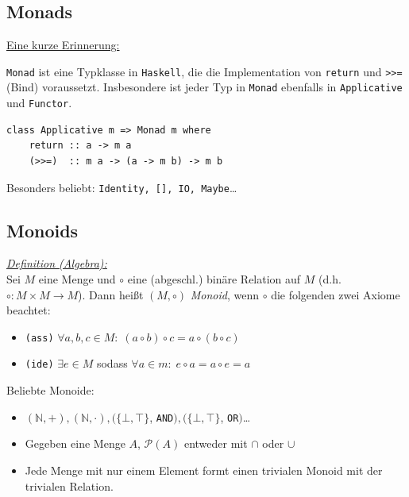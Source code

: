 \documentclass{beamer}
\begin{document}
\subsection*{Monads}

\begin{frame}[fragile]

\underline{Eine kurze Erinnerung:}\bigskip

\texttt{Monad} ist eine Typklasse in \texttt{Haskell}, die die Implementation von \texttt{return} und \texttt{>>=} (Bind) voraussetzt. Insbesondere ist jeder Typ in \texttt{Monad} ebenfalls in \texttt{Applicative} und \texttt{Functor}.\bigskip

\begin{verbatim}
class Applicative m => Monad m where
    return :: a -> m a
    (>>=)  :: m a -> (a -> m b) -> m b
\end{verbatim}
\pause

Besonders beliebt: \texttt{Identity, [], IO, Maybe}\dots
\end{frame}

\subsection*{Monoids}

\begin{frame}
\underline{\emph{Definition (Algebra):}}\\ Sei $M$ eine Menge und $\circ$ eine (abgeschl.) binäre Relation auf $M$ (d.h. $\circ : M \times M \to M$). Dann heißt $(M, \circ)$ \emph{Monoid}, wenn $\circ$ die folgenden zwei Axiome beachtet:

\begin{itemize}
\pause \item \texttt{(ass)} $\forall a,b,c \in M:\; (a \circ b) \circ c = a \circ (b \circ c)$
\pause \item \texttt{(ide)} $\exists e \in M$ sodass $\forall a \in m:\; e \circ a = a \circ e = a$
\end{itemize}
\pause\bigskip

Beliebte Monoide:
\begin{itemize}
\pause \item $(\mathbb{N}, +), (\mathbb{N}, \cdot), (\{\bot, \top\}$, \texttt{AND}$), (\{\bot, \top\}$, \texttt{OR}$)$\dots
\pause \item Gegeben eine Menge $A$, $\mathcal{P}(A)$ entweder mit $\cap$ oder $\cup$
\pause \item Jede Menge mit nur einem Element formt einen trivialen Monoid mit der trivialen Relation.
\end{itemize}

\end{frame}
\end{document}
